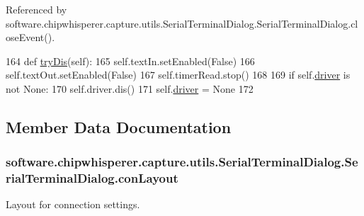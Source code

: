 Referenced by software.\+chipwhisperer.\+capture.\+utils.\+Serial\+Terminal\+Dialog.\+Serial\+Terminal\+Dialog.\+close\+Event().


\begin{DoxyCode}
164     \textcolor{keyword}{def }\hyperlink{classsoftware_1_1chipwhisperer_1_1capture_1_1utils_1_1SerialTerminalDialog_1_1SerialTerminalDialog_a35463a2267fb892451dae44436f4da93}{tryDis}(self):
165         self.textIn.setEnabled(\textcolor{keyword}{False})
166         self.textOut.setEnabled(\textcolor{keyword}{False})
167         self.timerRead.stop()
168         
169         \textcolor{keywordflow}{if} self.\hyperlink{classsoftware_1_1chipwhisperer_1_1capture_1_1utils_1_1SerialTerminalDialog_1_1SerialTerminalDialog_a89363e65c5e368f47737d1452d087066}{driver} \textcolor{keywordflow}{is} \textcolor{keywordflow}{not} \textcolor{keywordtype}{None}:
170             self.driver.dis()
171             self.\hyperlink{classsoftware_1_1chipwhisperer_1_1capture_1_1utils_1_1SerialTerminalDialog_1_1SerialTerminalDialog_a89363e65c5e368f47737d1452d087066}{driver} = \textcolor{keywordtype}{None}
172 
\end{DoxyCode}


\subsection{Member Data Documentation}
\hypertarget{classsoftware_1_1chipwhisperer_1_1capture_1_1utils_1_1SerialTerminalDialog_1_1SerialTerminalDialog_a9e370a51ba4b464068cc690d9520ed14}{}
\subsubsection[{con\+Layout}]{\setlength{\rightskip}{0pt plus 5cm}software.\+chipwhisperer.\+capture.\+utils.\+Serial\+Terminal\+Dialog.\+Serial\+Terminal\+Dialog.\+con\+Layout}\label{classsoftware_1_1chipwhisperer_1_1capture_1_1utils_1_1SerialTerminalDialog_1_1SerialTerminalDialog_a9e370a51ba4b464068cc690d9520ed14}


Layout for connection settings. 

